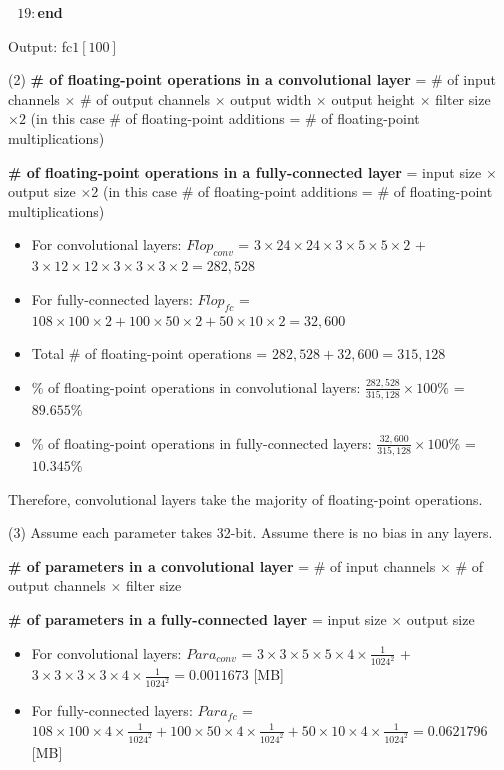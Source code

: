 \documentclass[11pt]{article}
\begin{document}
\begin{solution}
\item \qquad $\text{  } 19:$\textbf{end}
\item Output: fc$1[100]$
\item (2) \textbf{\# of floating-point operations in a convolutional layer} = \# of input channels $\times$ \# of output channels $\times$ output width $\times$ output height $\times$ filter size $\times 2$ (in this case \# of floating-point additions = \# of floating-point multiplications)
\item \textbf{\# of floating-point operations in a fully-connected layer} = input size $\times$ output size $\times 2$ (in this case \# of floating-point additions = \# of floating-point multiplications)
\begin{itemize}
\item For convolutional layers: $Flop_{conv}$ = $3 \times 24 \times 24 \times 3 \times 5 \times 5 \times 2$ + $3 \times 12 \times 12 \times 3 \times 3 \times 3 \times 2 = 282,528$
\item For fully-connected layers: $Flop_{fc}$ = $108 \times 100 \times 2 + 100 \times 50 \times 2 +  50 \times 10 \times 2 = 32,600$
\item Total \# of floating-point operations = $282,528 + 32,600 = 315,128$
\item \% of floating-point operations in convolutional layers: $\frac{282,528}{315,128} \times 100\%$ = $89.655\%$
\item \% of floating-point operations in fully-connected layers: $\frac{32,600}{315,128} \times 100\%$ = $10.345\%$
\end{itemize}
Therefore, convolutional layers take the majority of floating-point operations. 
\item (3) Assume each parameter takes 32-bit. Assume there is no bias in any layers.
\item \textbf{\# of parameters in a convolutional layer} =  \# of input channels $\times$ \# of output channels $\times$ filter size
\item \textbf{\# of parameters in a fully-connected layer} =  input size $\times$ output size
\begin{itemize}
\item For convolutional layers: $Para_{conv}$ = $3 \times 3 \times 5 \times 5 \times 4 \times \frac{1}{1024^2}$ + $3 \times 3 \times 3 \times 3 \times 4 \times \frac{1}{1024^2} = 0.0011673$ [MB]
\item For fully-connected layers: $Para_{fc}$ = $108 \times 100 \times 4 \times \frac{1}{1024^2} + 100 \times 50 \times 4 \times \frac{1}{1024^2} +  50 \times 10 \times 4 \times \frac{1}{1024^2} = 0.0621796$ [MB]

\end{itemize}
\end{solution}
\end{document}
